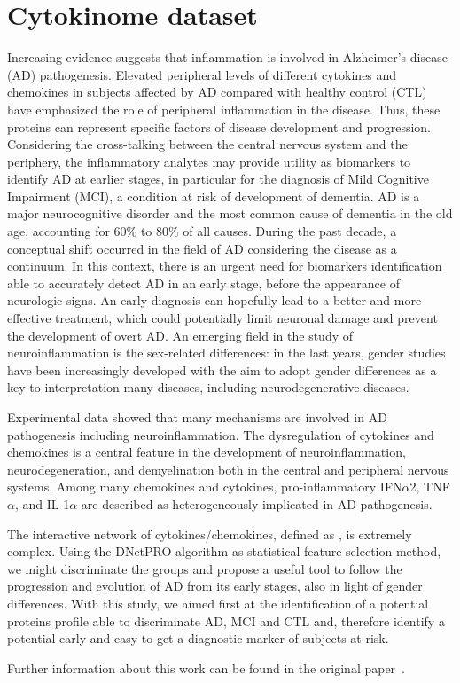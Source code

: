 \documentclass{standalone}
\begin{document}
\section[Cytokinome Dataset]{Cytokinome dataset}\label{cytokine:cytokine}

Increasing evidence suggests that inflammation is involved in Alzheimer's disease (AD) pathogenesis.
Elevated peripheral levels of different cytokines and chemokines in subjects affected by AD compared with healthy control (CTL) have emphasized the role of peripheral inflammation in the disease.
Thus, these proteins can represent specific factors of disease development and progression.
Considering the cross-talking between the central nervous system and the periphery, the inflammatory analytes may provide utility as biomarkers to identify AD at earlier stages, in particular for the diagnosis of Mild Cognitive Impairment (MCI), a condition at risk of development of dementia.
AD is a major neurocognitive disorder and the most common cause of dementia in the old age, accounting for 60\% to 80\% of all causes.
During the past decade, a conceptual shift occurred in the field of AD considering the disease as a continuum.
In this context, there is an urgent need for biomarkers identification able to accurately detect AD in an early stage, before the appearance of neurologic signs.
An early diagnosis can hopefully lead to a better and more effective treatment, which could potentially limit neuronal damage and prevent the development of overt AD.
An emerging field in the study of neuroinflammation is the sex-related differences: in the last years, gender studies have been increasingly developed with the aim to adopt gender differences as a key to interpretation many diseases, including neurodegenerative diseases.

Experimental data showed that many mechanisms are involved in AD pathogenesis including neuroinflammation.
The dysregulation of cytokines and chemokines is a central feature in the development of neuroinflammation, neurodegeneration, and demyelination both in the central and peripheral nervous systems.
Among many chemokines and cytokines, pro-inflammatory IFN$\alpha$2, TNF$\alpha$, and IL-1$\alpha$ are described as heterogeneously implicated in AD pathogenesis.

The interactive network of cytokines/chemokines, defined as , is extremely complex.
Using the \textsf{DNetPRO} algorithm as statistical feature selection method, we might discriminate the groups and propose a useful tool to follow the progression and evolution of AD from its early stages, also in light of gender differences.
With this study, we aimed first at the identification of a potential proteins profile able to discriminate AD, MCI and CTL and, therefore identify a potential early and easy to get a diagnostic marker of subjects at risk.

Further information about this work can be found in the original paper~\cite{Boccardi2019}.
\end{document}
